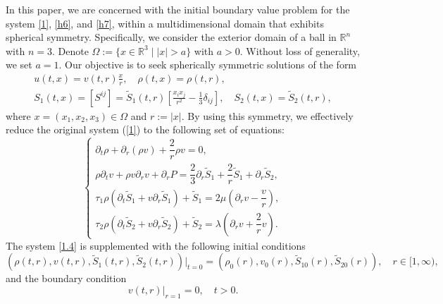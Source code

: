 \documentclass[10pt,reqno]{amsart}
\numberwithin{equation}{section}
\begin{document}
	In this paper, we are concerned with the initial boundary value problem for the system  \eqref{1}, \eqref{h6}, and \eqref{h7}, within a multidimensional domain that exhibits spherical symmetry. Specifically, we consider the exterior domain of a ball in \(\mathbb{R}^n\) with $n=3$. Denote \(\Omega := \{x \in \mathbb{R}^3 \mid |x| > a\}\) with \(a > 0\). Without loss of generality, we set $a = 1$.
	Our objective is to seek spherically symmetric solutions of the form
	\begin{equation}
		\begin{gathered}
			u(t, x) = v(t, r) \frac{x}{r}, \quad \rho(t, x) = \rho(t, r), \\
			S_1(t, x) = [S^{ij}] = \tilde{S}_1(t, r) \left[\frac{x_i x_j}{r^2} - \frac{1}{3} \delta_{ij}\right], \quad S_2(t, x) = \tilde{S}_2(t, r),
		\end{gathered}
	\end{equation}
	where \(x = (x_1, x_2, x_3) \in \Omega\) and \(r := |x|\). By using this symmetry, we effectively reduce the original system (\ref{1}) to the following set of equations:
	\begin{equation} \label{1.4}
		\begin{cases}
			\partial_t \rho + \partial_r (\rho v) + \dfrac{2}{r} \rho v = 0, \\
			\rho \partial_t v + \rho v \partial_r v + \partial_r P = \dfrac{2}{3} \partial_r \tilde{S}_1 + \dfrac{2}{r} \tilde{S}_1 + \partial_r \tilde{S}_2, \\
			\tau_1 \rho \left(\partial_t \tilde{S}_1 + v \partial_r \tilde{S}_1 \right) + \tilde{S}_1 = 2 \mu \left(\partial_r v - \dfrac{v}{r}\right), \\
			\tau_2 \rho \left(\partial_t \tilde{S}_2 + v \partial_r \tilde{S}_2 \right) + \tilde{S}_2 = \lambda \left(\partial_r v + \dfrac{2}{r} v\right).
		\end{cases}
	\end{equation}
	The system \eqref{1.4} is supplemented with the following initial conditions
	\begin{equation}\label{1.5}
		(\rho(t, r), v(t, r), \tilde{S}_1(t, r), \tilde{S}_2(t, r))|_{t=0} = (\rho_0(r), v_0(r), \tilde{S}_{10}(r), \tilde{S}_{20}(r)), \quad r \in [1, \infty),
	\end{equation}
	and the boundary condition
	\begin{equation}\label{1.6}
		v(t, r)|_{r=1} = 0, \quad t > 0.
	\end{equation} 
	
\end{document}
